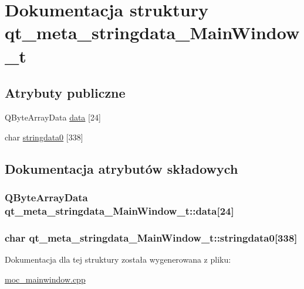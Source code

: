 \hypertarget{structqt__meta__stringdata___main_window__t}{}\section{Dokumentacja struktury qt\+\_\+meta\+\_\+stringdata\+\_\+\+Main\+Window\+\_\+t}
\label{structqt__meta__stringdata___main_window__t}
\subsection*{Atrybuty publiczne}
\begin{DoxyCompactItemize}
\item 
Q\+Byte\+Array\+Data \hyperlink{structqt__meta__stringdata___main_window__t_afe3efb55c44aeb65b1905fbb8b35699b}{data} \mbox{[}24\mbox{]}
\item 
char \hyperlink{structqt__meta__stringdata___main_window__t_a9c32d19c2666e5092f4b1b7ccd78fcd0}{stringdata0} \mbox{[}338\mbox{]}
\end{DoxyCompactItemize}


\subsection{Dokumentacja atrybutów składowych}
\subsubsection[{\texorpdfstring{data}{data}}]{\setlength{\rightskip}{0pt plus 5cm}Q\+Byte\+Array\+Data qt\+\_\+meta\+\_\+stringdata\+\_\+\+Main\+Window\+\_\+t\+::data\mbox{[}24\mbox{]}}\hypertarget{structqt__meta__stringdata___main_window__t_afe3efb55c44aeb65b1905fbb8b35699b}{}\label{structqt__meta__stringdata___main_window__t_afe3efb55c44aeb65b1905fbb8b35699b}
\subsubsection[{\texorpdfstring{stringdata0}{stringdata0}}]{\setlength{\rightskip}{0pt plus 5cm}char qt\+\_\+meta\+\_\+stringdata\+\_\+\+Main\+Window\+\_\+t\+::stringdata0\mbox{[}338\mbox{]}}\hypertarget{structqt__meta__stringdata___main_window__t_a9c32d19c2666e5092f4b1b7ccd78fcd0}{}\label{structqt__meta__stringdata___main_window__t_a9c32d19c2666e5092f4b1b7ccd78fcd0}


Dokumentacja dla tej struktury została wygenerowana z pliku\+:\begin{DoxyCompactItemize}
\item 
\hyperlink{moc__mainwindow_8cpp}{moc\+\_\+mainwindow.\+cpp}\end{DoxyCompactItemize}
